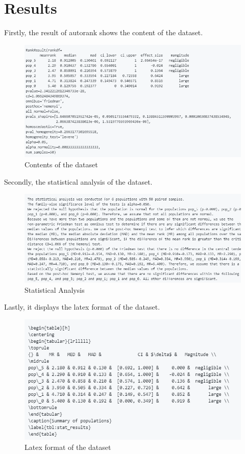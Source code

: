 \documentclass[12pt]{article}
\begin{document}
\section{Results}

Firstly, the result of autorank shows the content of the dataset.

\begin{figure}[!htbp]
	\centering
	\includegraphics[width=11 cm]{contents.png}
	\caption{Contents of the dataset}
\end{figure}

Secondly, the statistical analysis of the dataset.
\begin{figure}[!htbp]
	\centering
	\includegraphics[width=11 cm, height=4 cm]{statistical_analysis1.png}
	\caption{Statistical Analysis}
\end{figure}

\newpage

Lastly, it displays the latex format of the dataset.
\begin{figure}[!htbp]
	\centering
	\includegraphics[width=15 cm]{latex.png}
	\caption{Latex format of the dataset}
\end{figure}
\end{document}
